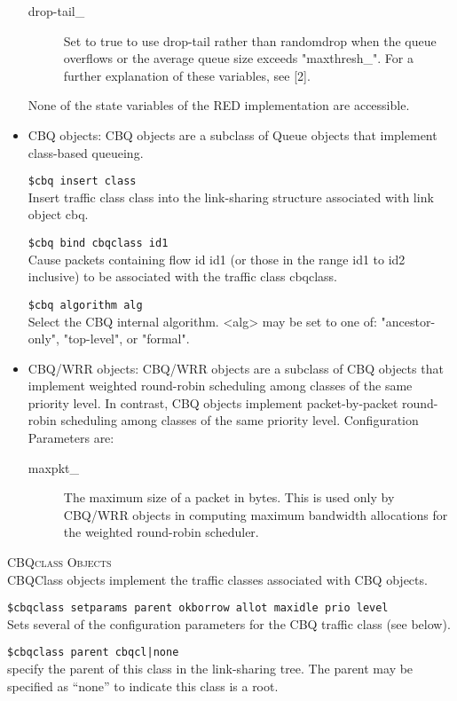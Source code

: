 \begin{itemize}
\begin{description}
\item[drop-tail\_]
Set to true to use drop-tail rather than randomdrop when the queue
overflows or the average queue size exceeds "maxthresh\_". For a further
explanation of these variables, see [2]. 
\end{description}
None of the state variables of the RED implementation are accessible. 


\item CBQ objects:
CBQ objects are a subclass of Queue objects that implement class-based
queueing. 

{\tt \$cbq insert \<class\>}\\
Insert traffic class class into the link-sharing structure associated with
link object cbq. 

{\tt \$cbq bind \<cbqclass\> \<id1\> [\$id2]}\\
Cause packets containing flow id id1 (or those in the range id1 to
id2 inclusive) to be associated with the traffic class cbqclass. 

{\tt \$cbq algorithm \<alg\>}\\
Select the CBQ internal algorithm. <alg> may be set to one of:
"ancestor-only", "top-level", or "formal". 


\item CBQ/WRR objects:
CBQ/WRR objects are a subclass of CBQ objects that implement weighted
round-robin scheduling among classes of the same priority level. In
contrast, CBQ objects implement packet-by-packet round-robin scheduling
among classes of the same priority level. Configuration Parameters are:
\begin{description}
\item[maxpkt\_] The maximum size of a packet in bytes. This is used only
by CBQ/WRR objects in computing maximum bandwidth allocations for the
weighted round-robin scheduler. 
\end{description}
\end{itemize}


\textsc{CBQclass Objects}\\
CBQClass objects implement the traffic classes associated with CBQ
objects. 

{\tt \$cbqclass setparams \<parent\> \<okborrow\> \<allot\> \<maxidle\> \<prio\> \<level\>}\\
Sets several of the configuration parameters for the CBQ traffic class
(see below). 

{\tt \$cbqclass parent \<cbqcl|none\>}\\
specify the parent of this class in the link-sharing tree. The parent may
be specified as ``none'' to indicate this class is a root. 

